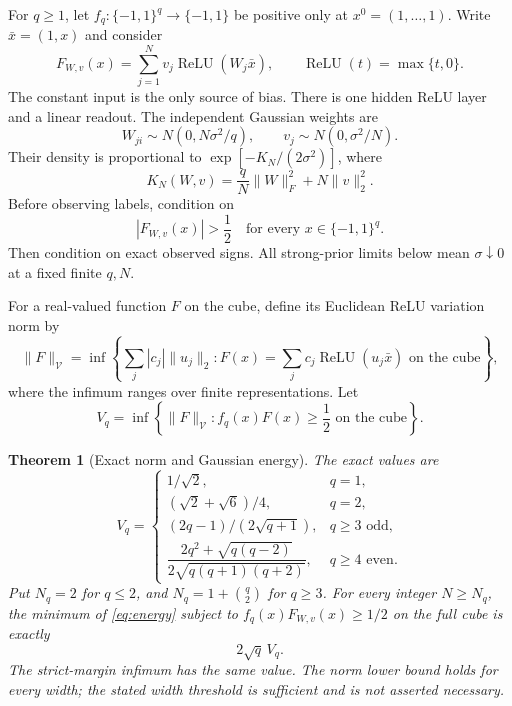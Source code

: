 \documentclass[11pt]{article}
\newtheorem{theorem}{Theorem}
\newcommand{\relu}{\operatorname{ReLU}}
\newcommand{\norm}[1]{\lVert #1\rVert}
\begin{document}
For $q\ge1$, let $f_q:\{-1,1\}^q\to\{-1,1\}$ be positive only at
$x^0=(1,\ldots,1)$. Write $\bar x=(1,x)$ and consider
\begin{equation}\label{eq:network}
 F_{W,v}(x)=\sum_{j=1}^N v_j\relu(W_j\bar x),
 \qquad \relu(t)=\max\{t,0\}.
\end{equation}
The constant input is the only source of bias. There is one hidden
ReLU layer and a linear readout. The independent Gaussian weights are
\begin{equation}\label{eq:prior}
 W_{ji}\sim N(0,N\sigma^2/q),\qquad
 v_j\sim N(0,\sigma^2/N).
\end{equation}
Their density is proportional to $\exp[-K_N/(2\sigma^2)]$, where
\begin{equation}\label{eq:energy}
 K_N(W,v)=\frac qN\norm W_F^2+N\norm v_2^2.
\end{equation}
Before observing labels, condition on
\begin{equation}\label{eq:global}
 |F_{W,v}(x)|>\frac12\quad\text{for every }x\in\{-1,1\}^q.
\end{equation}
Then condition on exact observed signs. All strong-prior limits below
mean $\sigma\downarrow0$ at a fixed finite $q,N$.

For a real-valued function $F$ on the cube, define its Euclidean ReLU
variation norm by
\[
 \norm F_{\mathcal V}
 =\inf\left\{\sum_j |c_j|\norm{u_j}_2:
 F(x)=\sum_j c_j\relu(u_j\bar x)\text{ on the cube}\right\},
\]
where the infimum ranges over finite representations. Let
\[
 V_q=\inf\left\{\norm F_{\mathcal V}:
 f_q(x)F(x)\ge\frac12\text{ on the cube}\right\}.
\]

\begin{theorem}[Exact norm and Gaussian energy]\label{thm:energy}
The exact values are
\begin{equation}\label{eq:values}
 V_q=
 \begin{cases}
  1/\sqrt2,&q=1,\\[2pt]
  (\sqrt2+\sqrt6)/4,&q=2,\\[2pt]
  (2q-1)/(2\sqrt{q+1}),&q\ge3\text{ odd},\\[2pt]
  \dfrac{2q^2+\sqrt{q(q-2)}}{2\sqrt{q(q+1)(q+2)}},
    &q\ge4\text{ even}.
 \end{cases}
\end{equation}
Put $N_q=2$ for $q\le2$, and $N_q=1+\binom q2$ for $q\ge3$.
For every integer $N\ge N_q$, the minimum of \eqref{eq:energy} subject
to $f_q(x)F_{W,v}(x)\ge1/2$ on the full cube is exactly
\[
 2\sqrt q\,V_q.
\]
The strict-margin infimum has the same value. The norm lower bound
holds for every width; the stated width threshold is sufficient and
is not asserted necessary.
\end{theorem}
\end{document}
